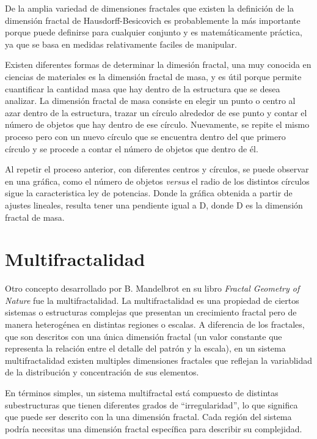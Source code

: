 De la  amplia variedad de dimensiones fractales que existen la definición de la dimensión fractal de Hausdorff-Besicovich es probablemente la más importante porque puede definirse para cualquier conjunto y es matemáticamente práctica, ya que se basa en medidas relativamente faciles de manipular.

Existen diferentes formas de determinar la dimesi\'{o}n fractal, una muy conocida en ciencias de materiales es la dimensi\'{o}n fractal de masa, y es \'{u}til porque permite cuantificar la cantidad masa que hay dentro de la estructura que se desea analizar. La dimensi\'{o}n fractal de masa consiste en elegir un punto o centro al azar dentro de la estructura, trazar un c\'{i}rculo alrededor de ese punto y contar el n\'{u}mero de objetos que hay dentro de ese c\'{i}rculo. Nuevamente, se repite el mismo proceso pero con un nuevo c\'{i}rculo que se encuentra dentro del que primero c\'{i}rculo y se procede a contar el n\'{u}mero de objetos que dentro de \'{e}l.

 Al repetir el proceso anterior, con diferentes centros y c\'{i}rculos, se puede observar en una gr\'{a}fica, como el n\'{u}mero de objetos \textit{versus} el radio de los distintos c\'{i}rculos sigue la caracteristica ley de potencias. Donde la gr\'{a}fica obtenida a partir de ajustes lineales, resulta tener una pendiente igual a D, donde D es la dimensi\'{o}n fractal de masa. 

\section{Multifractalidad}

Otro concepto desarrollado por B. Mandelbrot en su libro \textit{Fractal Geometry of Nature} fue la multifractalidad. La multifractalidad es una propiedad de ciertos sistemas o estructuras complejas que presentan un crecimiento fractal pero de manera heterog\'{e}nea en distintas regiones o escalas. A diferencia de los fractales, que son descritos con una \'{u}nica dimensi\'{o}n fractal (un valor constante que representa la relaci\'{o}n entre el detalle del patr\'{o}n y la escala), en un sistema multifractalidad existen multiples dimensiones fractales que reflejan la variablidad de la distribuci\'{o}n y concentraci\'{o}n de sus elementos. 

En t\'{e}rminos simples, un sistema multifractal est\'{a} compuesto de distintas subestructuras que tienen diferentes grados de ``irregularidad'', lo que significa que puede ser descrito con la una dimensi\'{o}n fractal. Cada regi\'{o}n del sistema podr\'{i}a necesitas una dimensi\'{o}n fractal espec\'{i}fica para describir su complejidad.


